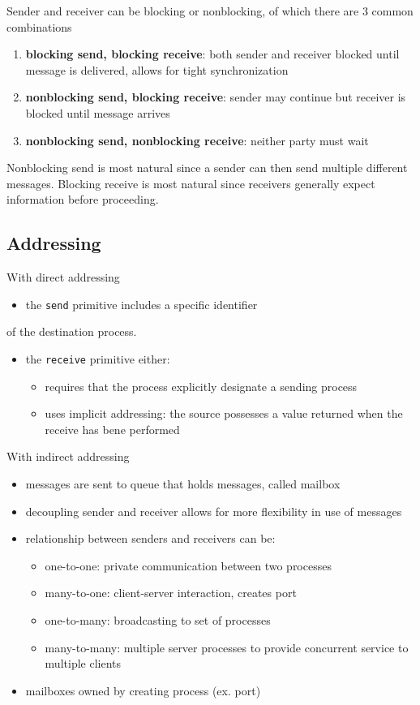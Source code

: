 \documentclass[11pt]{article}
\begin{document}
Sender and receiver can be blocking or nonblocking, of which there are
3 common combinations
\begin{enumerate}
\item \textbf{blocking send, blocking receive}: both sender and receiver blocked
until message is delivered, allows for tight synchronization
\item \textbf{nonblocking send, blocking receive}: sender may continue but
receiver is blocked until message arrives
\item \textbf{nonblocking send, nonblocking receive}: neither party must wait
\end{enumerate}

Nonblocking send is most natural since a sender can then send
multiple different messages.
Blocking receive is most natural since receivers generally expect
information before proceeding.
\subsection{Addressing}
\label{sec:orgcd9156f}
With direct addressing
\begin{itemize}
\item the \texttt{send} primitive includes a specific identifier
\end{itemize}
of the destination process.
\begin{itemize}
\item the \texttt{receive} primitive either:
\begin{itemize}
\item requires that the process explicitly designate a sending process
\item uses implicit addressing: the source possesses a value returned
when the receive has bene performed
\end{itemize}
\end{itemize}

With indirect addressing
\begin{itemize}
\item messages are sent to queue that holds messages, called mailbox
\item decoupling sender and receiver allows for more flexibility in
use of messages
\item relationship between senders and receivers can be:
\begin{itemize}
\item one-to-one: private communication between two processes
\item many-to-one: client-server interaction, creates port
\item one-to-many: broadcasting to set of processes
\item many-to-many: multiple server processes to provide
concurrent service to multiple clients
\end{itemize}
\item mailboxes owned by creating process (ex. port)
\end{itemize}
\end{document}
